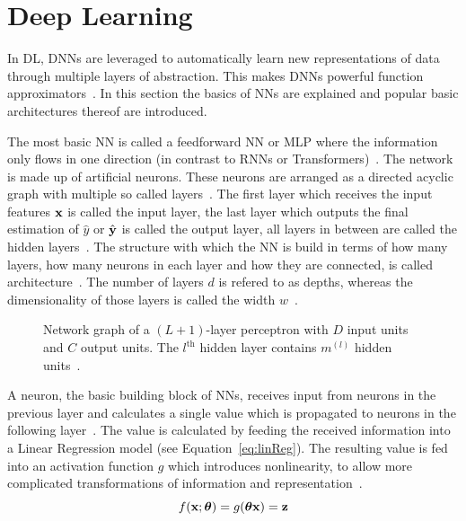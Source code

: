 \section{Deep Learning}
In \ac{DL}, \acp{DNN} are leveraged to automatically learn new representations of data through
multiple layers of abstraction.
This makes \acp{DNN} powerful function approximators~\citep{goodfellow_deep_2016}.
In this section the basics of \acp{NN} are explained and popular basic architectures thereof are
introduced.

The most basic \ac{NN} is called a feedforward \ac{NN} or \ac{MLP} where the information only
flows in one direction (in contrast to \acp{RNN} or Transformers)~\citep{goodfellow_deep_2016}.
The network is made up of artificial neurons.
These neurons are arranged as a directed acyclic graph with multiple so
called layers~\citep{goodfellow_deep_2016}.
The first layer which receives the input features $\textbf{x}$ is called the input layer, the last layer
which outputs the final estimation of $\hat{y}$ or $\hat{\textbf{y}}$ is called the output layer, all layers in between
are called the hidden layers~\citep{shrestha_review_2019}.
The structure with which the \ac{NN} is build in terms of how many layers, how many neurons in each
layer and how they are connected, is called architecture~\citep{goodfellow_deep_2016}.
The number of layers $d$ is refered to as depths, whereas the dimensionality of those layers is
called the width $w$~\citep{goodfellow_deep_2016}.
\begin{figure}[ht]
	\centering
    
	\caption[Network graph for a MLP.]{
        Network graph of a $(L+1)$-layer perceptron with $D$ input units and $C$ output units.
        The $l^{\text{th}}$ hidden layer contains $m^{(l)}$ hidden
        units~\citep{chauhan_review_2018,goodfellow_deep_2016}.
    }
	\label{fig:multilayer-perceptron}
\end{figure}
A neuron, the basic building block of \acp{NN}, receives input from neurons in the previous layer
and calculates a single value which is propagated to neurons in the following
layer~\citep{shrestha_review_2019}.
The value is calculated by feeding the received information into a Linear Regression model (see
Equation~\ref{eq:linReg}).
The resulting value is fed into an activation function $g$ which introduces nonlinearity, to allow
more complicated transformations of information and representation~\citep{goodfellow_deep_2016}.
\begin{equation}\label{eq:neuron}
    f(\textbf{x};\boldsymbol{\theta}) = g(\boldsymbol{\theta}\textbf{x})=\textbf{z}
\end{equation}

